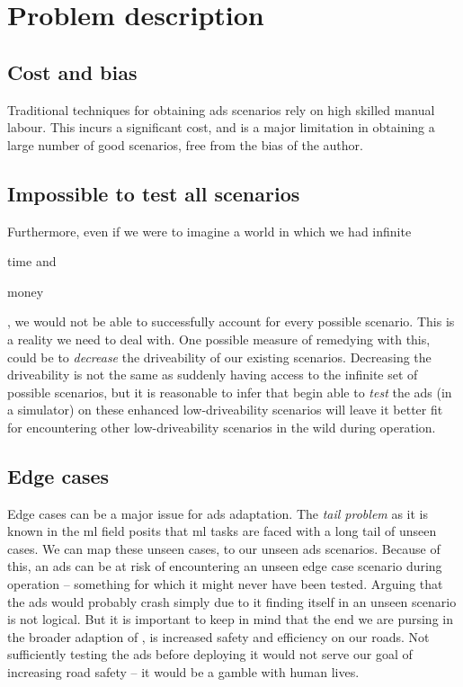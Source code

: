 \section{Problem description}\label{sec:problemDescription}

\subsection{Cost and bias}

Traditional techniques for obtaining \acrshort{ads} scenarios rely on high skilled manual labour.
This incurs a significant cost, and is a major limitation in obtaining a large number of good
scenarios, free from the bias of the author.


\subsection{Impossible to test all scenarios}
Furthermore, even if we were to imagine a world in which we had infinite \begin{inparaenum}
    \item time and
    \item money
\end{inparaenum}, we would not be able to successfully account for every possible scenario. This is
a reality we need to deal with. One possible measure of remedying with this, could be to
\textit{decrease} the driveability of our existing scenarios. Decreasing the driveability is not the
same as suddenly having access to the infinite set of possible scenarios, but it is reasonable to
infer that begin able to \textit{test} the \acrshort{ads} (in a simulator) on these enhanced
low-driveability scenarios will leave it better fit for encountering other low-driveability
scenarios in the wild during operation.

\subsection{Edge cases}

Edge cases can be a major issue for \acrshort{ads} adaptation. The \textit{tail problem} as it is
known in the \acrshort{ml} field posits that \acrshort{ml} tasks are faced with a long tail of
unseen cases. We can map these unseen cases, to our unseen \acrshort{ads} scenarios. Because of
this, an \acrshort{ads} can be at risk of encountering an unseen edge case scenario during
operation -- something for which it might never have been tested.
Arguing that the \acrshort{ads} would probably crash simply due to it finding itself in an unseen
scenario is not logical. But it is important to keep in mind that the end we are pursing in the
broader adaption of , is increased safety and efficiency on our roads. Not
sufficiently testing the \acrshort{ads} before deploying it would not serve our goal of increasing
road safety -- it would be a gamble with human lives.

